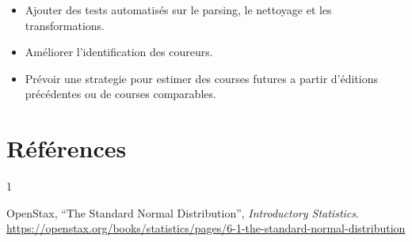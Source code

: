 \documentclass[12pt,a4paper]{article}
\begin{document}
\begin{itemize}
    \item Ajouter des tests automatisés sur le parsing, le nettoyage et les transformations.
    \item Améliorer l'identification des coureurs.
    \item Prévoir une strategie pour estimer des courses futures a partir d'éditions précédentes ou de courses comparables.
\end{itemize}

\clearpage

\section*{Références}

\begin{thebibliography}{1}

OpenStax, ``The Standard Normal Distribution'', \textit{Introductory Statistics}.
\url{https://openstax.org/books/statistics/pages/6-1-the-standard-normal-distribution}

\end{thebibliography}
\end{document}
